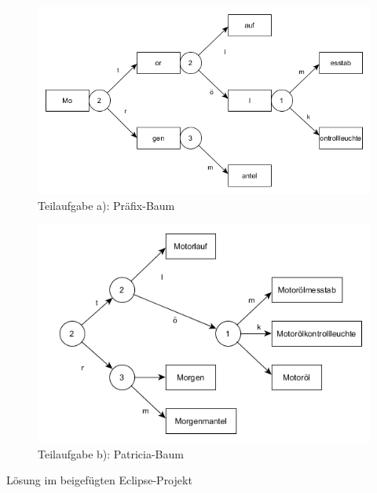 \documentclass[12pt]{scrartcl}
\begin{document}
\exercise{}
\begin{figure}[h!]
\begin{center}
\includegraphics[scale=0.65]{Prefix-Tree.png}
\caption{Teilaufgabe a): Präfix-Baum}
\end{center}
\end{figure}

\begin{figure}[h!]
\begin{center}
\includegraphics[scale=0.65]{Patricia-Tree.png}
\caption{Teilaufgabe b): Patricia-Baum}
\end{center}
\end{figure}


\exercise{}
Lösung im beigefügten Eclipse-Projekt



\end{document}
